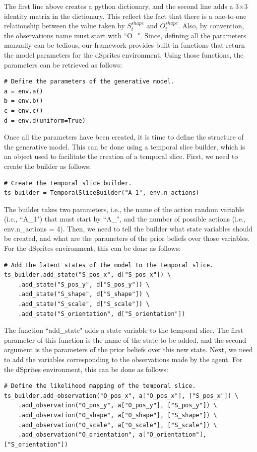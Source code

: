 \documentclass[twoside,11pt]{article}
\begin{document}
The first line above creates a python dictionary, and the second line adds a 3$\times$3 identity matrix in the dictionary. This reflect the fact that there is a one-to-one relationship between the value taken by $S_t^{shape}$ and $O_t^{shape}$. Also, by convention, the observations name must start with ``O\_". Since, defining all the parameters manually can be tedious, our framework provides built-in functions that return the model parameters for the dSprites environment. Using those functions, the parameters can be retrieved as follows:
\begin{verbatim}
# Define the parameters of the generative model.
a = env.a()
b = env.b()
c = env.c()
d = env.d(uniform=True)
\end{verbatim}
Once all the parameters have been created, it is time to define the structure of the generative model. This can be done using a temporal slice builder, which is an object used to facilitate the creation of a temporal slice. First, we need to create the builder as follows:
\begin{verbatim}
# Create the temporal slice builder.
ts_builder = TemporalSliceBuilder("A_1", env.n_actions)
\end{verbatim}
The builder takes two parameters, i.e., the name of the action random variable (i.e., ``A\_1") that must start by ``A\_", and the number of possible actions (i.e., env.n\_actions = 4). Then, we need to tell the builder what state variables should be created, and what are the parameters of the prior beliefs over those variables. For the dSprites environment, this can be done as follows:
\begin{verbatim}
# Add the latent states of the model to the temporal slice.
ts_builder.add_state("S_pos_x", d["S_pos_x"]) \
    .add_state("S_pos_y", d["S_pos_y"]) \
    .add_state("S_shape", d["S_shape"]) \
    .add_state("S_scale", d["S_scale"]) \
    .add_state("S_orientation", d["S_orientation"])
\end{verbatim}
The function ``add\_state" adds a state variable to the temporal slice. The first parameter of this function is the name of the state to be added, and the second argument is the parameters of the prior beliefs over this new state. Next, we need to add the variables corresponding to the observations made by the agent. For the dSprites environment, this can be done as follows:
\begin{verbatim}
# Define the likelihood mapping of the temporal slice.
ts_builder.add_observation("O_pos_x", a["O_pos_x"], ["S_pos_x"]) \
    .add_observation("O_pos_y", a["O_pos_y"], ["S_pos_y"]) \
    .add_observation("O_shape", a["O_shape"], ["S_shape"]) \
    .add_observation("O_scale", a["O_scale"], ["S_scale"]) \
    .add_observation("O_orientation", a["O_orientation"], ["S_orientation"])
\end{verbatim}
\end{document}
